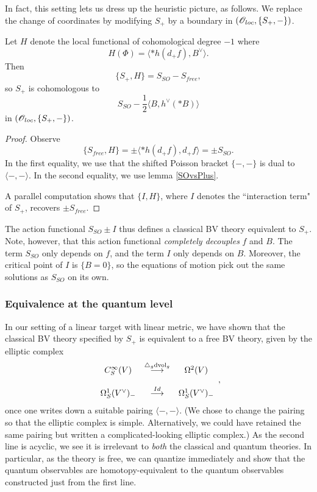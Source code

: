In fact, this setting lets us dress up the heuristic picture, as follows. We replace the change of coordinates by modifying $S_+$ by a boundary in $(\mathscr O_{loc}, \{S_+,-\})$.

\begin{lemma}
Let $H$ denote the local functional of cohomological degree $-1$ where
\[
H(\Phi) = \langle \ast h(d_+f),B^\vee \rangle.
\]
Then
\[
\{S_+,H\} = S_{SO} - S_{free},
\]
so $S_+$ is cohomologous to
\[
S_{SO} - \frac{1}{2} \langle B, h^\vee (\ast B) \rangle
\]
in $(\mathscr O_{loc}, \{S_+,-\})$.
\end{lemma}

\begin{proof}
Observe
\[
\{S_{free},H\} = \pm \langle \ast h(d_+ f), d_+f\rangle = \pm S_{SO}.
\]
In the first equality, we use that the shifted Poisson bracket $\{-,-\}$ is dual to $\langle -, - \rangle$. In the second equality, we use lemma \ref{SOvsPlus}.

A parallel computation shows that $\{I,H\}$, where $I$ denotes the ``interaction term" of $S_+$, recovers $\pm S_{free}$.
\end{proof}

The action functional $S_{SO} \pm I$ thus defines a classical BV theory equivalent to $S_+$. Note, however, that this action functional {\em completely decouples} $f$ and $B$. The term $S_{SO}$ only depends on $f$, and the term $I$ only depends on $B$. Moreover, the critical point of $I$ is $\{B = 0\}$, so the equations of motion pick out the same solutions as $S_{SO}$ on its own.

\subsubsection{Equivalence at the quantum level}

In our setting of a linear target with linear metric, we have shown that the classical BV theory specified by $S_+$ is equivalent to a free BV theory, given by the elliptic complex
\[
\begin{array}{ccc}
C^\infty_S(V) & \overset{\triangle_g {\rm dvol}_g}{\longrightarrow} &\Omega^2(V)\\
& &  \\
\Omega^1_S(V^\vee)_-& \overset{Id}{\longrightarrow} & \Omega^1_S(V^\vee)_-
\end{array},
\]
once one writes down a suitable pairing $\langle-,-\rangle$. (We chose to change the pairing so that the elliptic complex is simple. Alternatively, we could have retained the same pairing but written a complicated-looking elliptic complex.) As the second line is acyclic, we see it is irrelevant to {\em both} the classical and quantum theories. In particular, as the theory is free, we can quantize immediately and show that the quantum observables are homotopy-equivalent to the quantum observables constructed  just from the first line.

